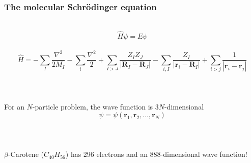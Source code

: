 \documentclass[mathserif]{beamer}
\begin{document}
\begin{frame}
    \frametitle{The molecular Schr\"{o}dinger equation}
    \ \\
    \begin{equation}
	\nonumber
	\hat{H}\psi = E\psi
    \end{equation}
    \ \\
    \begin{equation}
	\nonumber
	\hat{H} =   -\sum_I \frac{\nabla^2}{2M_I} - \sum_i \frac{\nabla^2}{2}
		    +\sum_{I>J} \frac{Z_IZ_J}{|\boldsymbol{R}_I-\boldsymbol{R}_J|} 
		    -\sum_{i,I} \frac{Z_I}{|\boldsymbol{r}_i-\boldsymbol{R}_I|} 
		    +\sum_{i>j} \frac{1}{|\boldsymbol{r}_i-\boldsymbol{r}_j|} 
    \end{equation}
    \ \\
    \ \\
    \ \\
    For an $N$-particle problem, the wave function is $3N$-dimensional
    \begin{equation}
	\nonumber
	\psi = \psi(\boldsymbol{r}_1,\boldsymbol{r}_2,\dots,\boldsymbol{r}_N)
    \end{equation}
    \ \\
    \ \\
    \ \\
    \pause
    $\beta$-Carotene ($C_{40}H_{56}$) has 296 electrons and an 888-dimensional wave function!
\end{frame}
\end{document}
